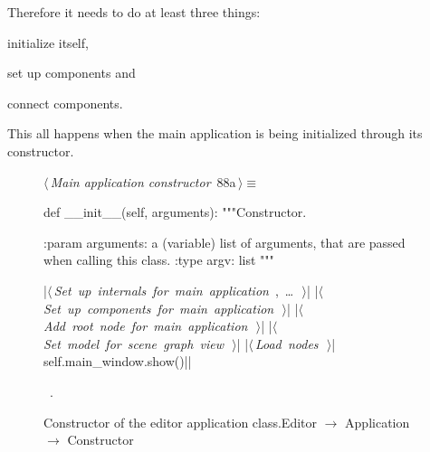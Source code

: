 \documentclass[%
    a4paper,    %
    justified,  %
    nobib,      %
    openany     %
]{tufte-book}
\makeatletter
\renewcommand{\label}[1]{\@tufte@label{##1}}%
\makeatother
\begin{document}
Therefore it needs to do at least three things:
\begin{enumerate*}
  \item initialize itself,
  \item set up components and
  \item connect components.
  \end{enumerate*}
This all happens when the main application is being initialized through its
constructor.

\begin{figure}[!htpb]
\begin{flushleft} \small
\begin{minipage}{\linewidth}\label{scrap13}\raggedright\small
{} $\langle\,${\itshape Main application constructor}\nobreak\ {\footnotesize {88a}}$\,\rangle\equiv$
\vspace{-1ex}
\begin{pythoncode}
def __init__(self, arguments):
    """Constructor.

    :param arguments: a (variable) list of arguments, that are
                      passed when calling this class.
    :type  argv:      list
    """

    |\hbox{$\langle\,${\itshape Set up internals for main application}\nobreak\ {\footnotesize {}, \ldots\ }$\,\rangle$}|
    |\hbox{$\langle\,${\itshape Set up components for main application}\nobreak\ {\footnotesize {}}$\,\rangle$}|
    |\hbox{$\langle\,${\itshape Add root node for main application}\nobreak\ {\footnotesize {}}$\,\rangle$}|
    |\hbox{$\langle\,${\itshape Set model for scene graph view}\nobreak\ {\footnotesize {}}$\,\rangle$}|
    |\hbox{$\langle\,${\itshape Load nodes}\nobreak\ {\footnotesize {}}$\,\rangle$}|
    self.main_window.show()|\NWsep|
\end{pythoncode}
\vspace{1.5ex}
\footnotesize
\begin{list}{}{\setlength{\itemsep}{-\parsep}\setlength{\itemindent}{-\leftmargin}}
\item \NWtxtMacroRefIn\ .

\item{}
\end{list}
\end{minipage}\vspace{4ex}
\end{flushleft}
\caption{Constructor of the editor application
    class.\newline{}\newline{}Editor $\rightarrow$ Application $\rightarrow$
    Constructor}
\end{figure}
\end{document}
